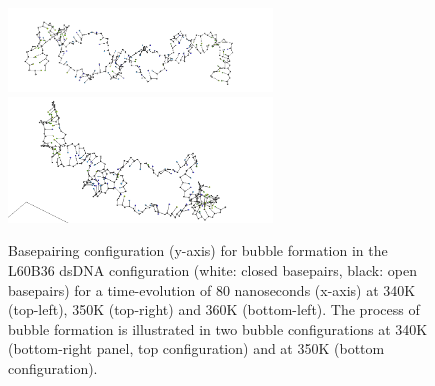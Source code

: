 \begin{figure}[hbt] \begin{minipage}{7cm}
 \end{minipage} \begin{minipage}{7cm}  \end{minipage}
\begin{minipage}{8cm}
 \end{minipage} \begin{minipage}{6cm}
\includegraphics[width=7cm]{images/L60B36_bubble2.png}\\
\includegraphics[width=7cm]{images/L60B36_bubble1.png} \end{minipage}
\begin{center}
\caption{Basepairing configuration (y-axis) for bubble formation in the L60B36 dsDNA configuration (white: closed basepairs, black: open basepairs) for a time-evolution of 80 nanoseconds (x-axis) at 340K (top-left), 350K (top-right) and 360K (bottom-left). The process of bubble formation is illustrated in two bubble configurations at 340K (bottom-right panel, top configuration) and at 350K (bottom configuration). }\label{L60B36_configs}
\end{center}
\end{figure}




